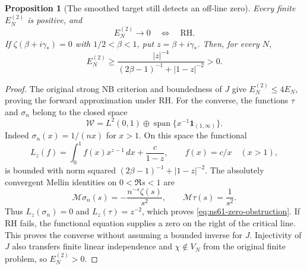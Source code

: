 \documentclass[11pt]{article}
\newtheorem{proposition}[theorem]{Proposition}
\theoremstyle{remark}
\begin{document}
\begin{proposition}[The smoothed target still detects an off-line zero]
\label{prop:ns61-rh-equivalence}
Every finite $E_N^{(2)}$ is positive, and
\[
 E_N^{(2)}\longrightarrow0\quad\Longleftrightarrow\quad\mathrm{RH}.
\]
If $\zeta(\beta+i\gamma_*)=0$ with $1/2<\beta<1$, put
$z=\beta+i\gamma_*$. Then, for every $N$,
\begin{equation}
 E_N^{(2)}\geq
 \frac{|z|^{-4}}{(2\beta-1)^{-1}+|1-z|^{-2}}>0.
 \label{eq:ns61-zero-obstruction}
\end{equation}
\end{proposition}
\begin{proof}
The original strong NB criterion and boundedness of $J$ give
$E_N^{(2)}\leq4E_N$, proving the forward approximation under RH.
For the converse, the functions $\tau$ and $\sigma_n$ belong to the
closed space
\[
 \mathcal W=L^2(0,1)\oplus
       \operatorname{span}\{x^{-1}\mathbf1_{(1,\infty)}\}.
\]
Indeed $\sigma_n(x)=1/(nx)$ for $x>1$. On this space the functional
\[
 L_z(f)=\int_0^1 f(x)x^{z-1}\,dx+\frac{c}{1-z},
 \qquad f(x)=c/x\quad(x>1),
\]
is bounded with norm squared $(2\beta-1)^{-1}+|1-z|^{-2}$.
The absolutely convergent Mellin identities on $0<\Re s<1$ are
\[
 \mathcal M\sigma_n(s)=-\frac{n^{-s}\zeta(s)}{s^2},
 \qquad \mathcal M\tau(s)=\frac1{s^2}.
\]
Thus $L_z(\sigma_n)=0$ and $L_z(\tau)=z^{-2}$, which proves
\eqref{eq:ns61-zero-obstruction}. If RH fails, the functional equation
supplies a zero on the right of the critical line. This proves the
converse without assuming a bounded inverse for $J$.
Injectivity of $J$ also transfers finite linear independence and
$\chi\notin V_N$ from the original finite problem, so $E_N^{(2)}>0$.
\end{proof}
\end{document}
